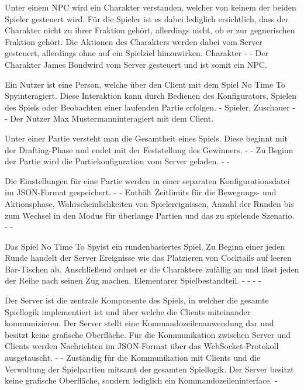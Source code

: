 {Unter einem NPC wird ein Charakter verstanden, welcher von keinem der beiden Spieler gesteuert wird. Für die Spieler ist es dabei lediglich ersichtlich, dass der Charakter nicht zu ihrer Fraktion gehört, allerdings nicht, ob er zur gegnerischen Fraktion gehört. Die Aktionen des Charakters werden dabei vom Server gesteuert, allerdings ohne auf ein Spielziel hinzuwirken.}
{Charakter}
{-}
{-}
{Der Charakter \glqq James Bond\grqq wird vom Server gesteuert und ist somit ein NPC.}

{Ein Nutzer ist eine Person, welche über den Client mit dem Spiel  \glqq No Time To Spy\grqq interagiert. Diese Interaktion kann durch Bedienen des Konfigurators, Spielen des Spiels oder Beobachten einer laufenden Partie erfolgen.}
{-}
{Spieler, Zuschauer}
{-}
{-}
{Der Nutzer \glqq Max Mustermann\grqq interagiert mit dem Client.}

{Unter einer Partie versteht man die Gesamtheit eines Spiels. Diese beginnt mit der Drafting-Phase und endet mit der Feststellung des Gewinners.}
{-}
{-}
{Zu Beginn der Partie wird die Partiekonfiguration vom Server geladen.}
{-}
{-}

{Die Einstellungen für eine Partie werden in einer separaten Konfigurationsdatei im JSON-Format gespeichert. }
{-}
{-}
{Enthält Zeitlimits für die Bewegungs- und Aktionsphase, Wahrscheinlichkeiten von Spielereignissen, Anzahl der Runden bis zum Wechsel in den Modus für überlange Partien und das zu spielende Szenario.}
{-}
{-}

{Das Spiel \glqq No Time To Spy\grqq ist ein rundenbasiertes Spiel. Zu Beginn einer jeden Runde handelt der Server Ereignisse wie das Platzieren von Cocktails auf leeren Bar-Tischen ab. Anschließend ordnet er die Charaktere zufällig an und lässt jeden der Reihe nach seinen Zug machen. }
{Elementarer Spielbestandteil.}
{-}
{-}
{-}
{-}

{Der Server ist die zentrale Komponente des Spiels, in welcher die gesamte Spiellogik implementiert ist und über welche die Clients miteinander kommunizieren. Der Server stellt eine Kommandozeilenanwendung dar und besitzt keine grafische Oberfläche. Für die Kommunikation zwischen Server und Clients werden Nachrichten im JSON-Format über das WebSocket-Protokoll ausgetauscht.}
{-}
{-}
{Zuständig für die Kommunikation mit Clients und die Verwaltung der Spielpartien mitsamt der gesamten Spiellogik.}
{Der Server besitzt keine grafische Oberfläche, sondern lediglich ein Kommandozeileninterface.}
{-}

